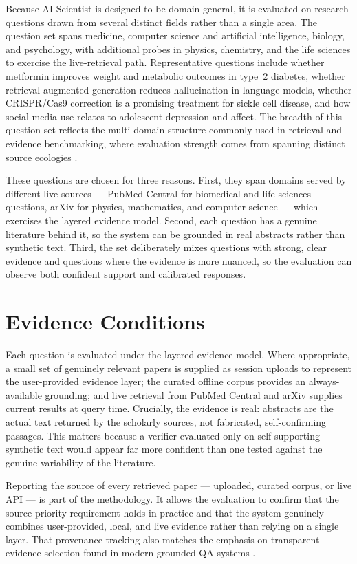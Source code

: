 Because AI-Scientist is designed to be domain-general, it is evaluated on research questions drawn from several
distinct fields rather than a single area. The question set spans medicine, computer science and artificial
intelligence, biology, and psychology, with additional probes in physics, chemistry, and the life sciences to
exercise the live-retrieval path. Representative questions include whether metformin improves weight and metabolic
outcomes in type~2 diabetes, whether retrieval-augmented generation reduces hallucination in language models,
whether CRISPR/Cas9 correction is a promising treatment for sickle cell disease, and how social-media use relates
to adolescent depression and affect.
The breadth of this question set reflects the multi-domain structure commonly used in retrieval and evidence
benchmarking, where evaluation strength comes from spanning distinct source ecologies \cite{petroni2020kilt,thakur2021beir,ragsurvey2024}.

These questions are chosen for three reasons. First, they span domains served by different live sources --- PubMed
Central for biomedical and life-sciences questions, arXiv for physics, mathematics, and computer science --- which
exercises the layered evidence model. Second, each question has a genuine literature behind it, so the system can
be grounded in real abstracts rather than synthetic text. Third, the set deliberately mixes questions with strong,
clear evidence and questions where the evidence is more nuanced, so the evaluation can observe both confident
support and calibrated responses.

\section{Evidence Conditions }

Each question is evaluated under the layered evidence model. Where appropriate, a small set of genuinely relevant
papers is supplied as session uploads to represent the user-provided evidence layer; the curated offline corpus
provides an always-available grounding; and live retrieval from PubMed Central and arXiv supplies current results
at query time. Crucially, the evidence is real: abstracts are the actual text returned by the scholarly sources,
not fabricated, self-confirming passages. This matters because a verifier evaluated only on self-supporting
synthetic text would appear far more confident than one tested against the genuine variability of the literature.

Reporting the source of every retrieved paper --- uploaded, curated corpus, or live API --- is part of the
methodology. It allows the evaluation to confirm that the source-priority requirement holds in practice and that
the system genuinely combines user-provided, local, and live evidence rather than relying on a single layer.
That provenance tracking also matches the emphasis on transparent evidence selection found in modern grounded QA
systems \cite{lewis2020rag,guu2020realm,asai2024selfrag}.

